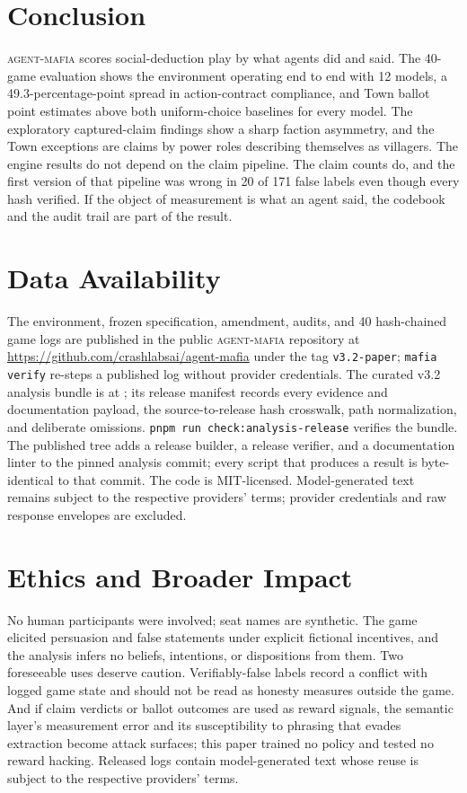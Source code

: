 \documentclass[11pt]{article}
\newcommand{\sys}{\textsc{agent-mafia}}
\newcommand{\code}[1]{\texttt{#1}}
\begin{document}
\section{Conclusion}
\label{sec:conclusion}

\sys{} scores social-deduction play by what agents did and said. The 40-game evaluation shows the environment operating end to end with 12 models, a 49.3-percentage-point spread in action-contract compliance, and Town ballot point estimates above both uniform-choice baselines for every model. The exploratory captured-claim findings show a sharp faction asymmetry, and the Town exceptions are claims by power roles describing themselves as villagers. The engine results do not depend on the claim pipeline. The claim counts do, and the first version of that pipeline was wrong in 20 of 171 false labels even though every hash verified. If the object of measurement is what an agent said, the codebook and the audit trail are part of the result.

\section*{Data Availability}
The environment, frozen specification, amendment, audits, and 40 hash-chained game logs are published in the public \sys{} repository at \url{https://github.com/crashlabsai/agent-mafia} under the tag \code{v3.2-paper}; \code{mafia verify} re-steps a published log without provider credentials. The curated v3.2 analysis bundle is at ; its release manifest records every evidence and documentation payload, the source-to-release hash crosswalk, path normalization, and deliberate omissions. \code{pnpm run check:analysis-release} verifies the bundle. The published tree adds a release builder, a release verifier, and a documentation linter to the pinned analysis commit; every script that produces a result is byte-identical to that commit. The code is MIT-licensed. Model-generated text remains subject to the respective providers' terms; provider credentials and raw response envelopes are excluded.

\section*{Ethics and Broader Impact}
No human participants were involved; seat names are synthetic. The game elicited persuasion and false statements under explicit fictional incentives, and the analysis infers no beliefs, intentions, or dispositions from them. Two foreseeable uses deserve caution. Verifiably-false labels record a conflict with logged game state and should not be read as honesty measures outside the game. And if claim verdicts or ballot outcomes are used as reward signals, the semantic layer's measurement error and its susceptibility to phrasing that evades extraction become attack surfaces; this paper trained no policy and tested no reward hacking. Released logs contain model-generated text whose reuse is subject to the respective providers' terms.
\end{document}
